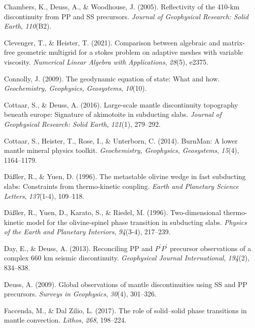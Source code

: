 \documentclass[
  paper=a4,
  ,captions=tableheading
]{scrartcl}
\newlength{\cslhangindent}
\newenvironment{CSLReferences}[2] %
  {\begin{list}{}{%
   \setlength{\itemindent}{0pt}
   \setlength{\leftmargin}{0pt}
   \setlength{\parsep}{0pt}
   \ifodd #1
    \setlength{\leftmargin}{\cslhangindent}
    \setlength{\itemindent}{-1\cslhangindent}
   \fi
   \setlength{\itemsep}{#2\baselineskip}}}
  {\end{list}}
\begin{document}
\begin{CSLReferences}{1}{0}
Chambers, K., Deuss, A., \& Woodhouse, J. (2005). Reflectivity of the
410-km discontinuity from PP and SS precursors. \emph{Journal of
Geophysical Research: Solid Earth}, \emph{110}(B2).

Clevenger, T., \& Heister, T. (2021). Comparison between algebraic and
matrix-free geometric multigrid for a stokes problem on adaptive meshes
with variable viscosity. \emph{Numerical Linear Algebra with
Applications}, \emph{28}(5), e2375.

Connolly, J. (2009). The geodynamic equation of state: What and how.
\emph{Geochemistry, Geophysics, Geosystems}, \emph{10}(10).

Cottaar, S., \& Deuss, A. (2016). Large-scale mantle discontinuity
topography beneath europe: Signature of akimotoite in subducting slabs.
\emph{Journal of Geophysical Research: Solid Earth}, \emph{121}(1),
279--292.

Cottaar, S., Heister, T., Rose, I., \& Unterborn, C. (2014). BurnMan: A
lower mantle mineral physics toolkit. \emph{Geochemistry, Geophysics,
Geosystems}, \emph{15}(4), 1164--1179.

Däßler, R., \& Yuen, D. (1996). The metastable olivine wedge in fast
subducting slabs: Constraints from thermo-kinetic coupling. \emph{Earth
and Planetary Science Letters}, \emph{137}(1-4), 109--118.

Däßler, R., Yuen, D., Karato, S., \& Riedel, M. (1996). Two-dimensional
thermo-kinetic model for the olivine-spinel phase transition in
subducting slabs. \emph{Physics of the Earth and Planetary Interiors},
\emph{94}(3-4), 217--239.

Day, E., \& Deuss, A. (2013). Reconciling PP and {\(P^\prime P^\prime\)}
precursor observations of a complex 660 km seismic discontinuity.
\emph{Geophysical Journal International}, \emph{194}(2), 834--838.

Deuss, A. (2009). Global observations of mantle discontinuities using SS
and PP precursors. \emph{Surveys in Geophysics}, \emph{30}(4), 301--326.

Faccenda, M., \& Dal Zilio, L. (2017). The role of solid--solid phase
transitions in mantle convection. \emph{Lithos}, \emph{268}, 198--224.


\end{CSLReferences}
\end{document}
